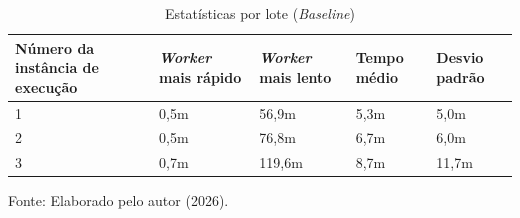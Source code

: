 \begin{table}[hbt!]
    \centering
    \caption{Estatísticas por lote (\textit{Baseline})}
    \label{tab:estatisticas}
    \begin{tabular}{p{2cm} p{2cm} p{2cm} p{2cm} p{2cm}}
        \toprule
        \textbf{Número da instância de execução} & \textbf{\textit{Worker} mais rápido} & \textbf{\textit{Worker} mais lento} & \textbf{Tempo médio} & \textbf{Desvio padrão} \\
        \midrule
        1 & 0{,}5m & 56{,}9m & 5{,}3m & 5{,}0m\\
        2 & 0{,}5m & 76{,}8m & 6{,}7m & 6{,}0m\\
        3 & 0{,}7m & 119{,}6m & 8{,}7m & 11{,}7m\\
        \bottomrule
    \end{tabular}

    \vspace{0.2cm}
    \small{Fonte: Elaborado pelo autor (2026).}
\end{table}
